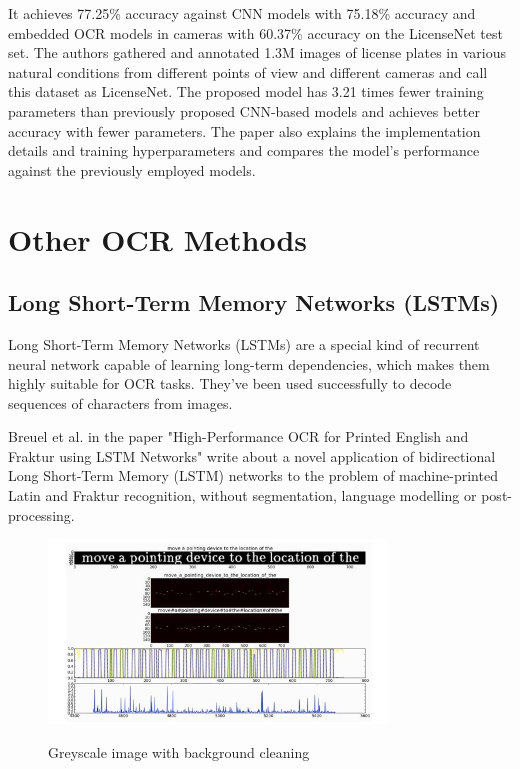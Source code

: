 It achieves 77.25\% accuracy against CNN models with 75.18\% accuracy and embedded OCR models in cameras with 60.37\% accuracy on the LicenseNet test set. The authors gathered and annotated 1.3M images of license plates in various natural conditions from different points of view and different cameras and call this dataset as LicenseNet. The proposed model has 3.21 times fewer training parameters than previously proposed CNN-based models and achieves better accuracy with fewer parameters. The paper also explains the implementation details and training hyperparameters and compares the model's performance against the previously employed models.\cite{azadbakhtMultiPathViTOCR2022}

\newpage

\section{Other OCR Methods}

\subsection{Long Short-Term Memory Networks (LSTMs)}

Long Short-Term Memory Networks (LSTMs) are a special kind of recurrent neural network capable of learning long-term dependencies, which makes them highly suitable for OCR tasks. They've been used successfully to decode sequences of characters from images.\cite{breuelHighPerformanceOCRPrinted2013}

Breuel et al. in the paper "High-Performance OCR for Printed English and Fraktur using LSTM Networks" write about a novel application of bidirectional Long Short-Term Memory (LSTM) networks to the problem of machine-printed Latin and Fraktur recognition, without segmentation, language modelling or post-processing.

\begin{figure}[ht]
    \centering
    \includegraphics[width=0.8\textwidth]{Figures/LSTM_Breuel.jpg}
    \caption[Bruel's illustration of the training steps of the LSTM recognizer]{Greyscale image with background cleaning}\cite{breuelHighPerformanceOCRPrinted2013}
    \label{fig:Breuel LSTM Paper}
\end{figure}



